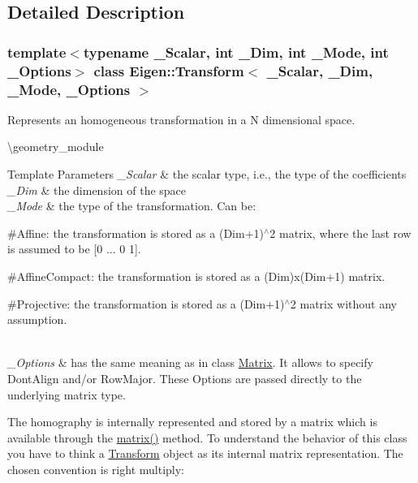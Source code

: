 \subsection{Detailed Description}
\subsubsection*{template$<$typename \+\_\+\+Scalar, int \+\_\+\+Dim, int \+\_\+\+Mode, int \+\_\+\+Options$>$\newline
class Eigen\+::\+Transform$<$ \+\_\+\+Scalar, \+\_\+\+Dim, \+\_\+\+Mode, \+\_\+\+Options $>$}

Represents an homogeneous transformation in a N dimensional space. 

\textbackslash{}geometry\+\_\+module


\begin{DoxyTemplParams}{Template Parameters}
{\em \+\_\+\+Scalar} & the scalar type, i.\+e., the type of the coefficients \\
\hline
{\em \+\_\+\+Dim} & the dimension of the space \\
\hline
{\em \+\_\+\+Mode} & the type of the transformation. Can be\+:
\begin{DoxyItemize}
\item \#\+Affine\+: the transformation is stored as a (Dim+1)$^\wedge$2 matrix, where the last row is assumed to be \mbox{[}0 ... 0 1\mbox{]}.
\item \#\+Affine\+Compact\+: the transformation is stored as a (Dim)x(Dim+1) matrix.
\item \#\+Projective\+: the transformation is stored as a (Dim+1)$^\wedge$2 matrix without any assumption. 
\end{DoxyItemize}\\
\hline
{\em \+\_\+\+Options} & has the same meaning as in class \mbox{\hyperlink{class_eigen_1_1_matrix}{Matrix}}. It allows to specify Dont\+Align and/or Row\+Major. These Options are passed directly to the underlying matrix type.\\
\hline
\end{DoxyTemplParams}
The homography is internally represented and stored by a matrix which is available through the \mbox{\hyperlink{class_eigen_1_1_transform_aee6c4863933d3660e56e3333e0506cc2}{matrix()}} method. To understand the behavior of this class you have to think a \mbox{\hyperlink{class_eigen_1_1_transform}{Transform}} object as its internal matrix representation. The chosen convention is right multiply\+:


